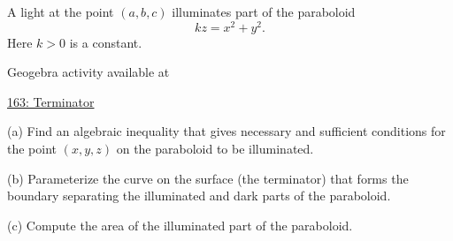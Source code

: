 \documentclass{ximera}
\begin{document}
\begin{question}  \label{Qweregtt5}
A light at the point $(a,b,c)$ illuminates part of the paraboloid
\[
  k z = x^2 + y^2.
\]
Here $k>0$ is a constant.

 
\begin{onlineOnly}
    \begin{center}
\end{center}
\end{onlineOnly}

Geogebra activity available at

\href{https://www.geogebra.org/classic/nfkajvkp}{163: Terminator}



(a) Find an algebraic inequality that gives necessary and sufficient conditions for the point $(x,y,z)$ on the paraboloid to be illuminated.

(b) Parameterize the curve on the surface (the terminator) that forms the boundary separating the illuminated and dark parts of the paraboloid. 

(c) Compute the area of the illuminated part of the paraboloid.
\end{question}
\end{document}
